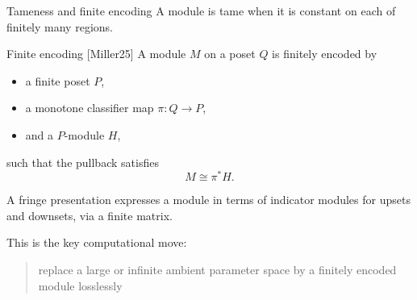 \documentclass[aspectratio=169,11pt]{beamer}
\begin{document}
\begin{frame}{Tameness and finite encoding}
\small
A module is tame when it is constant on each of finitely many regions.

\medskip
\begin{block}{Finite encoding [Miller25]}
A module $M$ on a poset $Q$ is finitely encoded by
\begin{itemize}
  \item a finite poset $P$,
  \item a monotone classifier map $\pi : Q \to P$,
  \item and a $P$-module $H$,
\end{itemize}
such that the pullback satisfies
\[
M \cong \pi^* H.
\]
\end{block}

\medskip
A fringe presentation expresses a module in terms of indicator modules for upsets and downsets, via a finite matrix.

\medskip
This is the key computational move:
\begin{quote}
replace a large or infinite ambient parameter space by a finitely encoded module losslessly
\end{quote}
\end{frame}
\end{document}
